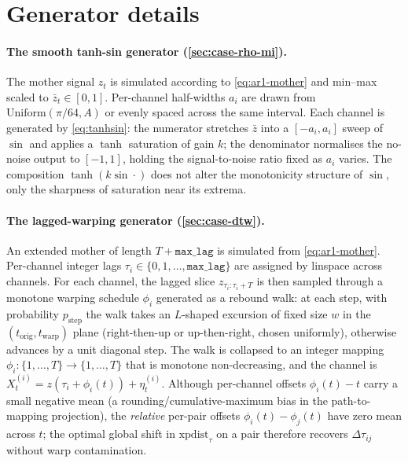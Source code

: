 \documentclass{article}
\theoremstyle{plain}
\theoremstyle{definition}
\theoremstyle{remark}
\begin{document}
\section{Generator details}
\label{app:generators}

\paragraph{The smooth tanh-sin generator (\cref{sec:case-rho-mi}).}
The mother signal $z_t$ is simulated according to \cref{eq:ar1-mother} and min--max scaled to $\bar{z}_t \in [0,1]$. Per-channel half-widths $a_i$ are drawn from $\mathrm{Uniform}(\pi/64, A)$ or evenly spaced across the same interval. Each channel is generated by \cref{eq:tanhsin}: the numerator stretches $\bar{z}$ into a $[-a_i, a_i]$ sweep of $\sin$ and applies a $\tanh$ saturation of gain $k$; the denominator normalises the no-noise output to $[-1,1]$, holding the signal-to-noise ratio fixed as $a_i$ varies. The composition $\tanh(k\sin\cdot)$ does not alter the monotonicity structure of $\sin$, only the sharpness of saturation near its extrema.

\paragraph{The lagged-warping generator (\cref{sec:case-dtw}).}
An extended mother of length $T + \texttt{max\_lag}$ is simulated from \cref{eq:ar1-mother}. Per-channel integer lags $\tau_i \in \{0,1,\dots,\texttt{max\_lag}\}$ are assigned by linspace across channels. For each channel, the lagged slice $z_{\tau_i:\tau_i+T}$ is then sampled through a monotone warping schedule $\phi_i$ generated as a rebound walk: at each step, with probability $p_{\text{step}}$ the walk takes an $L$-shaped excursion of fixed size $w$ in the $(t_{\text{orig}}, t_{\text{warp}})$ plane (right-then-up or up-then-right, chosen uniformly), otherwise advances by a unit diagonal step. The walk is collapsed to an integer mapping $\phi_i:\{1,\dots,T\}\to\{1,\dots,T\}$ that is monotone non-decreasing, and the channel is $X^{(i)}_t = z(\tau_i + \phi_i(t)) + \eta^{(i)}_t$. Although per-channel offsets $\phi_i(t)-t$ carry a small negative mean (a rounding/cumulative-maximum bias in the path-to-mapping projection), the \emph{relative} per-pair offsets $\phi_i(t)-\phi_j(t)$ have zero mean across $t$; the optimal global shift in $\mathrm{xpdist}_\tau$ on a pair therefore recovers $\Delta\tau_{ij}$ without warp contamination.
\end{document}

